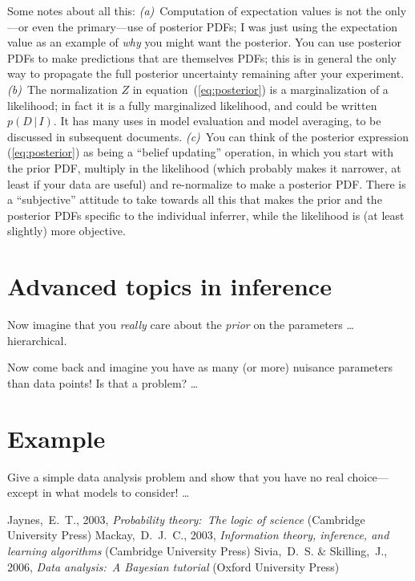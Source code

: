 \documentclass[12pt,twoside]{article}
\newcommand{\documentname}{document}
\newcommand{\documentnames}{\documentname s}
\newcommand{\equationname}{equation}
\newcounter{problem}
\newcommand{\given}{\,|\,}
\begin{document}
Some notes about all this: \textsl{(a)}~Computation of expectation
values is not the only---or even the primary---use of posterior PDFs;
I was just using the expectation value as an example of \emph{why} you
might want the posterior.  You can use posterior PDFs to make
predictions that are themselves PDFs; this is in general the only way
to propagate the full posterior uncertainty remaining after your
experiment. \textsl{(b)}~The normalization $Z$ in
\equationname~(\ref{eq:posterior}) is a marginalization of a
likelihood; in fact it is a fully marginalized likelihood, and could
be written $p(D \given I)$.  It has many uses in model evaluation and
model averaging, to be discussed in subsequent \documentnames.
\textsl{(c)}~You can think of the posterior expression
(\ref{eq:posterior}) as being a ``belief updating'' operation, in
which you start with the prior PDF, multiply in the likelihood (which
probably makes it narrower, at least if your data are useful) and
re-normalize to make a posterior PDF.  There is a ``subjective''
attitude to take towards all this that makes the prior and the
posterior PDFs specific to the individual inferrer, while the
likelihood is (at least slightly) more objective.

\section{Advanced topics in inference}

Now imagine that you \emph{really} care about the \emph{prior} on the parameters \ldots hierarchical.

Now come back and imagine you have as many (or more) nuisance parameters than data points!  Is that a problem? \ldots

\section{Example}

Give a simple data analysis problem and show that you have no real
choice---except in what models to consider! \ldots

\clearpage
{}\theendnotes

\clearpage
\begin{thebibliography}{}
  Jaynes,~E.~T., 2003,
  \textit{Probability theory:\ The logic of science} (Cambridge University Press)
  Mackay,~D.~J.~C., 2003,
  \textit{Information theory, inference, and learning algorithms} (Cambridge University Press)
  Sivia,~D.~S. \& Skilling,~J., 2006,
  \textit{Data analysis:\ A Bayesian tutorial} (Oxford University Press)
\end{thebibliography}
\end{document}
